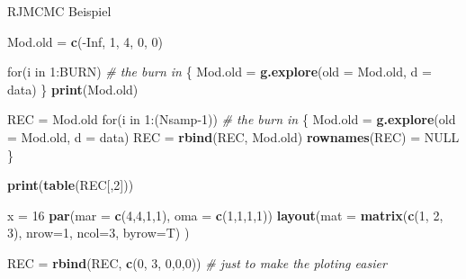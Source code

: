 \documentclass[ignorenonframetext,]{beamer}
\newenvironment{Shaded}{\begin{snugshade}}{\end{snugshade}}
\newcommand{\KeywordTok}[1]{\textcolor[rgb]{0.13,0.29,0.53}{\textbf{{#1}}}}
\newcommand{\DataTypeTok}[1]{\textcolor[rgb]{0.13,0.29,0.53}{{#1}}}
\newcommand{\DecValTok}[1]{\textcolor[rgb]{0.00,0.00,0.81}{{#1}}}
\newcommand{\StringTok}[1]{\textcolor[rgb]{0.31,0.60,0.02}{{#1}}}
\newcommand{\CommentTok}[1]{\textcolor[rgb]{0.56,0.35,0.01}{\textit{{#1}}}}
\newcommand{\OtherTok}[1]{\textcolor[rgb]{0.56,0.35,0.01}{{#1}}}
\newcommand{\NormalTok}[1]{{#1}}
\begin{document}
\begin{frame}{RJMCMC Beispiel}
\begin{Shaded}
\begin{Highlighting}[]
\NormalTok{Mod.old  =}\StringTok{ }\KeywordTok{c}\NormalTok{(-}\OtherTok{Inf}\NormalTok{, }\DecValTok{1}\NormalTok{, }\DecValTok{4}\NormalTok{, }\DecValTok{0}\NormalTok{, }\DecValTok{0}\NormalTok{)}

\NormalTok{for(i in }\DecValTok{1}\NormalTok{:BURN) }\CommentTok{# the burn in}
\NormalTok{\{}
\NormalTok{Mod.old =}\StringTok{ }\KeywordTok{g.explore}\NormalTok{(}\DataTypeTok{old =} \NormalTok{Mod.old, }\DataTypeTok{d =} \NormalTok{data)}
\NormalTok{\}}
\KeywordTok{print}\NormalTok{(Mod.old)}

\NormalTok{REC =}\StringTok{ }\NormalTok{Mod.old}
\NormalTok{for(i in }\DecValTok{1}\NormalTok{:(Nsamp}\DecValTok{-1}\NormalTok{)) }\CommentTok{# the burn in}
\NormalTok{\{}
\NormalTok{Mod.old =}\StringTok{ }\KeywordTok{g.explore}\NormalTok{(}\DataTypeTok{old =} \NormalTok{Mod.old, }\DataTypeTok{d =} \NormalTok{data)}
\NormalTok{REC =}\StringTok{ }\KeywordTok{rbind}\NormalTok{(REC, Mod.old)}
\KeywordTok{rownames}\NormalTok{(REC) =}\StringTok{ }\OtherTok{NULL}
\NormalTok{\}}

\KeywordTok{print}\NormalTok{(}\KeywordTok{table}\NormalTok{(REC[,}\DecValTok{2}\NormalTok{]))}

\NormalTok{x =}\StringTok{ }\DecValTok{16}
\KeywordTok{par}\NormalTok{(}\DataTypeTok{mar =} \KeywordTok{c}\NormalTok{(}\DecValTok{4}\NormalTok{,}\DecValTok{4}\NormalTok{,}\DecValTok{1}\NormalTok{,}\DecValTok{1}\NormalTok{), }\DataTypeTok{oma =} \KeywordTok{c}\NormalTok{(}\DecValTok{1}\NormalTok{,}\DecValTok{1}\NormalTok{,}\DecValTok{1}\NormalTok{,}\DecValTok{1}\NormalTok{))}
\KeywordTok{layout}\NormalTok{(}\DataTypeTok{mat =} \KeywordTok{matrix}\NormalTok{(}\KeywordTok{c}\NormalTok{(}\DecValTok{1}\NormalTok{, }\DecValTok{2}\NormalTok{, }\DecValTok{3}\NormalTok{), }\DataTypeTok{nrow=}\DecValTok{1}\NormalTok{, }\DataTypeTok{ncol=}\DecValTok{3}\NormalTok{, }\DataTypeTok{byrow=}\NormalTok{T) )}

\NormalTok{REC =}\StringTok{ }\KeywordTok{rbind}\NormalTok{(REC, }\KeywordTok{c}\NormalTok{(}\DecValTok{0}\NormalTok{, }\DecValTok{3}\NormalTok{, }\DecValTok{0}\NormalTok{,}\DecValTok{0}\NormalTok{,}\DecValTok{0}\NormalTok{)) }\CommentTok{# just to make the ploting easier}


\end{Highlighting}
\end{Shaded}
\end{frame}
\end{document}
